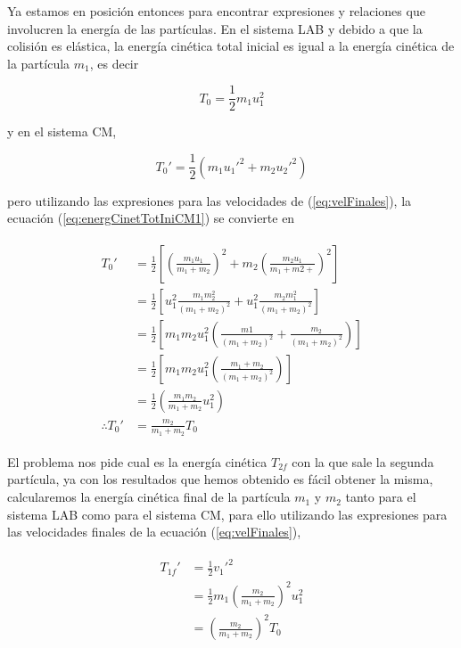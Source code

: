 \documentclass[a4paper,10pt]{article}
\begin{document}
Ya estamos en posición entonces para encontrar expresiones y relaciones que involucren
la energía de las partículas. En el sistema LAB y debido a que la colisión es elástica,
la energía cinética total inicial es igual a la energía cinética de la partícula $m_1$,
es decir

\begin{equation}
 T_0 = \frac{1}{2} m_1 u_1^2
 \label{eq:energCinetTotIniLAB}
\end{equation}

y en el sistema CM,


\begin{equation}
 T_0' = \frac{1}{2} (m_1 u_1'^2 + m_2 u_2'^2)
 \label{eq:energCinetTotIniCM1}
\end{equation}

pero utilizando las expresiones para las velocidades de (\ref{eq:velFinales}), 
la ecuación (\ref{eq:energCinetTotIniCM1}) se convierte en 

\begin{align}
\begin{split}
 T_0' &= \frac{1}{2} \left[ \left(\frac{m_1 u_1}{m_1 + m_2}\right)^2 + m_2 \left(\frac{m_2 u_1}{m_1 + m2+}\right)^2\right] \\
       &= \frac{1}{2} \left[ u_1^2 \frac{m_1 m_2^2}{(m_1+m_2)^2} + u_1^2 \frac{m_2 m_1^2}{(m_1+m_2)^2}\right] \\
       &= \frac{1}{2} \left[ m_1 m_2 u_1^2 \left( \frac{m1}{(m_1 + m_2)^2} + \frac{m_2}{(m_1 + m_2)^2}\right)\right] \\
       &= \frac{1}{2} \left[ m_1 m_2 u_1^2 \left( \frac{m_1+m_2}{(m_1+m_2)^2}\right) \right] \\
       &= \frac{1}{2} \left( \frac{m_1 m_2}{m_1+m_2}u_1^2 \right) \\
\therefore T_0' &= \frac{m_2}{m_1+m_2} T_0
\end{split}
\end{align}

El problema nos pide cual es la energía cinética $T_{2f}$ con la que sale la segunda partícula,
ya con los resultados que hemos obtenido es fácil obtener la misma, calcularemos
la energía cinética final de la partícula $m_1$ y $m_2$ tanto para el sistema
LAB como para el sistema CM, para ello utilizando las expresiones para las 
velocidades finales de la ecuación (\ref{eq:velFinales}),

\begin{align}
\begin{split} 
%
 T_{1f}' &= \frac{1}{2} v_1'^2 \\
	 &= \frac{1}{2}m_1\left(\frac{m_2}{m_1+m_2}\right)^2 u_1^2 \\
	 &= \left(\frac{m_2}{m_1+m_2}\right)^2 T_0\\
%
\label{eq:erergCineFinalm1CM}
\end{split}
\end{align}
\end{document}
